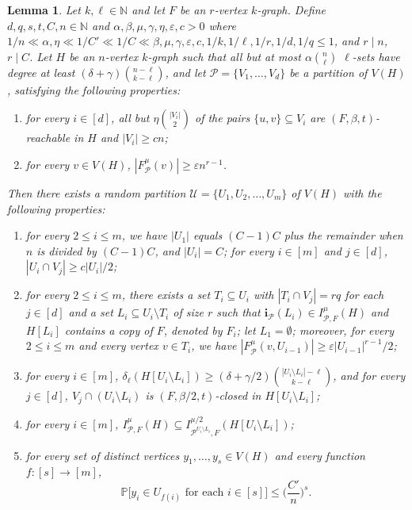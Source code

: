 \documentclass[11pt, letterpaper]{amsart}
\theoremstyle{plain}
\numberwithin{equation}{section}
\newtheorem{lemma}[thm]{Lemma}
\theoremstyle{definition}
\newcommand\card[1]{\left| #1 \right|}
\renewcommand{\vec}[1]{{\mathbf #1}}
\begin{document}
\begin{lemma}\label{random cluster}
Let $k,\ell\in \mathbb{N}$ and let $F$ be an $r$-vertex $k$-graph.
Define $d,q,s,t,C,n\in \mathbb{N}$ and $\alpha,\beta,\mu,\gamma,\eta,\varepsilon,c>0$ where $1/n\ll \alpha,\eta\ll1/C'\ll 1/C\ll \beta,\mu,\gamma,\varepsilon,c,1/k,1/\ell,1/r,1/d,1/q \le 1$, and $r\mid n$, $r\mid C$. 
Let $H$ be an $n$-vertex $k$-graph such that all but at most $\alpha \binom{n}{\ell}$ $\ell$-sets have degree at least $(\delta+\gamma)\binom{n-\ell}{k-\ell}$, and let $\mathcal{P}=\{V_1,\dots,V_d\}$ be a partition of $V(H)$, satisfying the following properties:
\begin{enumerate}[label=(P\arabic*)]
\item for every $i\in [d]$, all but $\eta\binom{\card{V_i}}{2}$ of the pairs $\{u,v\}\subseteq V_i$ are $(F,\beta,t)$-reachable in $H$ and $\card{V_i}\ge cn$;
\item for every $ v\in V(H) $, $ \card{F^{\mu}_{\mathcal{P}}(v)}\ge \varepsilon{n}^{r-1}$.
\end{enumerate}
Then there exists a random partition $\mathcal{U}=\{U_1,U_2,\dots,U_m\}$ of $V(H)$ with the following properties:
\begin{enumerate}[label=(R\arabic*)]
\item for every $2\le i\le m$, we have $\card{U_1}$ equals $(C-1)C$ plus the remainder when $n$ is divided by $(C-1)C$, and $|U_i|=C$; for every $i\in[m]$ and $j\in [d] $, $|U_i\cap V_j|\ge c|U_i|/2$;\label{item:(R1)}

    \item for every $2\le i\le m$, there exists a set $T_i\subseteq U_i$ with $|T_i\cap V_j|=rq$ for each $j\in[d]$ and a set $L_i\subseteq U_i\setminus T_i$ of size $r$ such that $\vec{i}_{\mathcal{P}}(L_i)\in I_{\mathcal{P},F}^{\mu}(H)$ and $H[L_i]$ contains a copy of $F$, denoted by $F_i$; let \(L_1=\emptyset\); moreover, for every \(2\le i\le m\) and every vertex $v\in T_{i}$, we have $\card{F^{\mu}_{\mathcal{P}}(v, U_{i-1})}\ge \varepsilon{\card{U_{i-1}}}^{r-1}/2 $;\label{item:(R-robust)}
            
\item for every $i\in[m]$, $\delta_{\ell}(H[U_i\setminus L_i])\ge \left(\delta+\gamma/2\right)\binom{|U_i\setminus L_i|-\ell}{k-\ell}$, and for every $j\in[d]$, $V_j\cap (U_i\setminus L_i)$ is $(F,\beta/2,t)$-closed in $H[U_i\setminus L_i]$;\label{item:(R-degree)}
            
\item for every $i\in [m]$, 
$I_{\mathcal{P},F}^{\mu}(H)\subseteq I_{ \mathcal{P}^{U_i\setminus L_i},F}^{\mu/2}(H[U_i\setminus L_i])$;\label{item:(R4)}
            
\item for every set of distinct vertices $y_1,\dots,y_s\in V(H)$ and every function $f:[s]\rightarrow[m]$, \label{item:(R5)}
\[\mathbb{P}\big[y_i\in U_{f(i)}\text{ for each }i\in[s]\big]\le \Big({\frac{C'}{n}}\Big)^s. 
\]
\end{enumerate}
\end{lemma}
\end{document}
